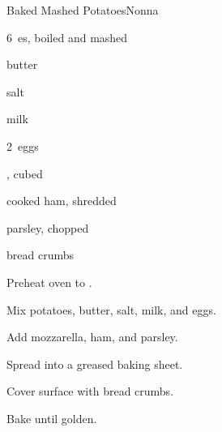\begin{recipe}{Baked Mashed Potatoes}{Nonna}{}

\begin{ingredients}
\item 6~es, boiled and mashed
\item {} butter
\item salt
\item \C{\quarter} milk
\item 2~eggs
\item {}, cubed
\item cooked ham, shredded
\item {} parsley, chopped
\item bread crumbs
\end{ingredients}

\begin{directions}
\item Preheat oven to .
\item Mix potatoes, butter, salt, milk, and eggs.
\item Add mozzarella, ham, and parsley.
\item Spread into a greased baking sheet.
\item Cover surface with bread crumbs.
\item Bake until golden.
\end{directions}

\end{recipe}
